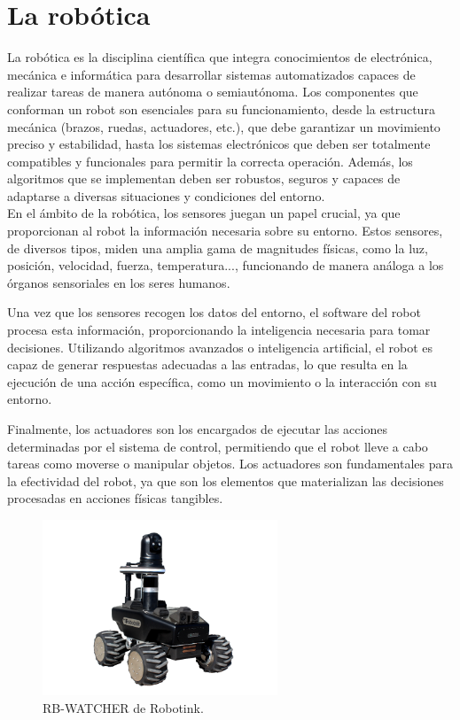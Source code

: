 \section{La robótica}
\label{sec:miseccion} %

La robótica es la disciplina científica que integra conocimientos de electrónica, mecánica e informática para desarrollar sistemas automatizados capaces de realizar tareas de manera autónoma o semiautónoma. Los componentes que conforman un robot son esenciales para su funcionamiento, desde la estructura mecánica (brazos, ruedas, actuadores, etc.), que debe garantizar un movimiento preciso y estabilidad, hasta los sistemas electrónicos que deben ser totalmente compatibles y funcionales para permitir la correcta operación. Además, los algoritmos que se implementan deben ser robustos, seguros y capaces de adaptarse a diversas situaciones y condiciones del entorno. \\

En el ámbito de la robótica, los sensores juegan un papel crucial, ya que proporcionan al robot la información necesaria sobre su entorno. Estos sensores, de diversos tipos, miden una amplia gama de magnitudes físicas, como la luz, posición, velocidad, fuerza, temperatura..., funcionando de manera análoga a los órganos sensoriales en los seres humanos. 

Una vez que los sensores recogen los datos del entorno, el software del robot procesa esta información, proporcionando la inteligencia necesaria para tomar decisiones. Utilizando algoritmos avanzados o inteligencia artificial, el robot es capaz de generar respuestas adecuadas a las entradas, lo que resulta en la ejecución de una acción específica, como un movimiento o la interacción con su entorno. 

Finalmente, los actuadores son los encargados de ejecutar las acciones determinadas por el sistema de control, permitiendo que el robot lleve a cabo tareas como moverse o manipular objetos. Los actuadores son fundamentales para la efectividad del robot, ya que son los elementos que materializan las decisiones procesadas en acciones físicas tangibles. 

\begin{figure} [h!]
  \begin{center}
    \includegraphics[width=7cm]{figs/Robot_intro}
  \end{center}
  \caption{\centering RB-WATCHER de Robotink.}
  \label{fig:Robot_intro}
\end{figure}

